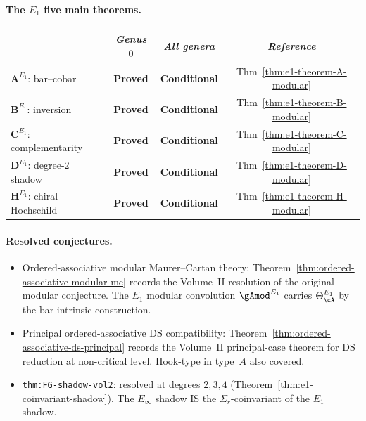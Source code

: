 \paragraph{The $E_1$ five main theorems.}
\begin{center}
\renewcommand{\arraystretch}{1.15}
\begin{tabular}{lccc}
\toprule
& \emph{Genus $0$} & \emph{All genera} & \emph{Reference} \\
\midrule
$\mathbf{A}^{E_1}$: bar--cobar
 & \textbf{Proved}
 & \textbf{Conditional}
 & Thm~\ref{thm:e1-theorem-A-modular} \\
$\mathbf{B}^{E_1}$: inversion
 & \textbf{Proved}
 & \textbf{Conditional}
 & Thm~\ref{thm:e1-theorem-B-modular} \\
$\mathbf{C}^{E_1}$: complementarity
 & \textbf{Proved}
 & \textbf{Conditional}
 & Thm~\ref{thm:e1-theorem-C-modular} \\
$\mathbf{D}^{E_1}$: degree-$2$ shadow
 & \textbf{Proved}
 & \textbf{Conditional}
 & Thm~\ref{thm:e1-theorem-D-modular} \\
$\mathbf{H}^{E_1}$: chiral Hochschild
 & \textbf{Proved}
 & \textbf{Conditional}
 & Thm~\ref{thm:e1-theorem-H-modular} \\
\bottomrule
\end{tabular}
\end{center}

\paragraph{Resolved conjectures.}
\begin{itemize}
\item Ordered-associative modular Maurer--Cartan theory:
 Theorem~\ref{thm:ordered-associative-modular-mc} records the
 Volume~II resolution of the original modular conjecture.
 The $E_1$ modular convolution ${\gAmod}^{E_1}$ carries
 $\Theta_\cA^{E_1}$ by the bar-intrinsic construction.
\item Principal ordered-associative DS compatibility:
 Theorem~\ref{thm:ordered-associative-ds-principal} records the
 Volume~II principal-case theorem for DS reduction at non-critical level.
 Hook-type in type~$A$ also covered.
\item \texttt{thm:FG-shadow-vol2}: resolved at degrees $2, 3, 4$
 (Theorem~\ref{thm:e1-coinvariant-shadow}).
 The $E_\infty$ shadow IS the $\Sigma_r$-coinvariant of
 the $E_1$ shadow.
\end{itemize}

